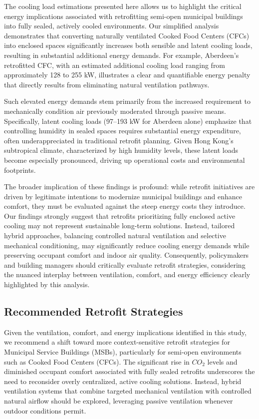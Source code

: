 \documentclass[preprint,12pt]{elsarticle}
\begin{document}
The cooling load estimations presented here allows us to highlight the critical energy implications associated with retrofitting semi-open municipal buildings into fully sealed, actively cooled environments. Our simplified analysis demonstrates that converting naturally ventilated Cooked Food Centers (CFCs) into enclosed spaces significantly increases both sensible and latent cooling loads, resulting in substantial additional energy demands. For example, Aberdeen's retrofitted CFC, with an estimated additional cooling load ranging from approximately 128 to 255 kW, illustrates a clear and quantifiable energy penalty that directly results from eliminating natural ventilation pathways.

Such elevated energy demands stem primarily from the increased requirement to mechanically condition air previously moderated through passive means. Specifically, latent cooling loads (97–193 kW for Aberdeen alone) emphasize that controlling humidity in sealed spaces requires substantial energy expenditure, often underappreciated in traditional retrofit planning. Given Hong Kong’s subtropical climate, characterized by high humidity levels, these latent loads become especially pronounced, driving up operational costs and environmental footprints.

The broader implication of these findings is profound: while retrofit initiatives are driven by legitimate intentions to modernize municipal buildings and enhance comfort, they must be evaluated against the steep energy costs they introduce. Our findings strongly suggest that retrofits prioritizing fully enclosed active cooling may not represent sustainable long-term solutions. Instead, tailored hybrid approaches, balancing controlled natural ventilation and selective mechanical conditioning, may significantly reduce cooling energy demands while preserving occupant comfort and indoor air quality. Consequently, policymakers and building managers should critically evaluate retrofit strategies, considering the nuanced interplay between ventilation, comfort, and energy efficiency clearly highlighted by this analysis.




\subsection{Recommended Retrofit Strategies}
Given the ventilation, comfort, and energy implications identified in this study, we recommend a shift toward more context-sensitive retrofit strategies for Municipal Service Buildings (MSBs), particularly for semi-open environments such as Cooked Food Centers (CFCs). The significant rise in $CO_2$ levels and diminished occupant comfort associated with fully sealed retrofits underscores the need to reconsider overly centralized, active cooling solutions. Instead, hybrid ventilation systems that combine targeted mechanical ventilation with controlled natural airflow should be explored, leveraging passive ventilation whenever outdoor conditions permit.
\end{document}
